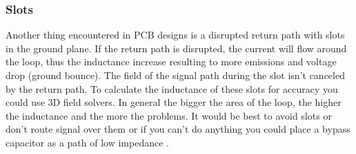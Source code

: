 \documentclass[final]{cubedoc}
\begin{document}
	
	
	\subsubsection{Slots}
	
	Another thing encountered in PCB designs is a disrupted return path with slots in the ground plane. If the return path is disrupted, the current will flow around the loop, thus the inductance increase resulting to more emissions and voltage drop (ground bounce). The field of the signal path during the slot isn't canceled by the return path. To calculate the inductance of these slots for accuracy you could use 3D field solvers. In general the bigger the area of the loop, the higher the inductance and the more the problems. It would be best to avoid slots or don't route signal over them or if you can't do anything you could place a bypass capacitor as a path of low impedance \cite{stackexchange:radiation, brooks2003signal}.
	
	
	
\end{document}
